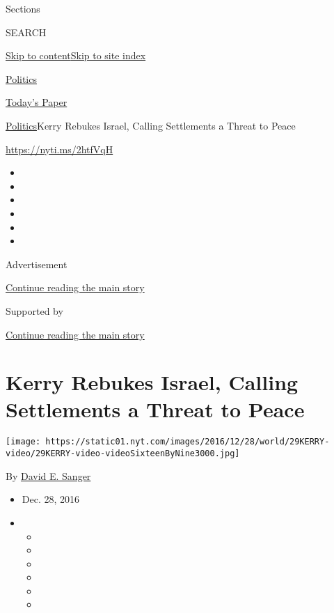 Sections

SEARCH

\protect\hyperlink{site-content}{Skip to
content}\protect\hyperlink{site-index}{Skip to site index}

\href{https://www.nytimes.com/section/politics}{Politics}

\href{https://myaccount.nytimes.com/auth/login?response_type=cookie\&client_id=vi}{}

\href{https://www.nytimes.com/section/todayspaper}{Today's Paper}

\href{/section/politics}{Politics}\textbar{}Kerry Rebukes Israel,
Calling Settlements a Threat to Peace

\url{https://nyti.ms/2htfVqH}

\begin{itemize}
\item
\item
\item
\item
\item
\item
\end{itemize}

Advertisement

\protect\hyperlink{after-top}{Continue reading the main story}

Supported by

\protect\hyperlink{after-sponsor}{Continue reading the main story}

\hypertarget{kerry-rebukes-israel-calling-settlements-a-threat-to-peace}{%
\section{Kerry Rebukes Israel, Calling Settlements a Threat to
Peace}\label{kerry-rebukes-israel-calling-settlements-a-threat-to-peace}}

\texttt{[image: https://static01.nyt.com/images/2016/12/28/world/29KERRY-video/29KERRY-video-videoSixteenByNine3000.jpg]}

By \href{http://www.nytimes.com/by/david-e-sanger}{David E. Sanger}

\begin{itemize}
\item
  Dec. 28, 2016
\item
  \begin{itemize}
  \item
  \item
  \item
  \item
  \item
  \item
  \end{itemize}
\end{itemize}

